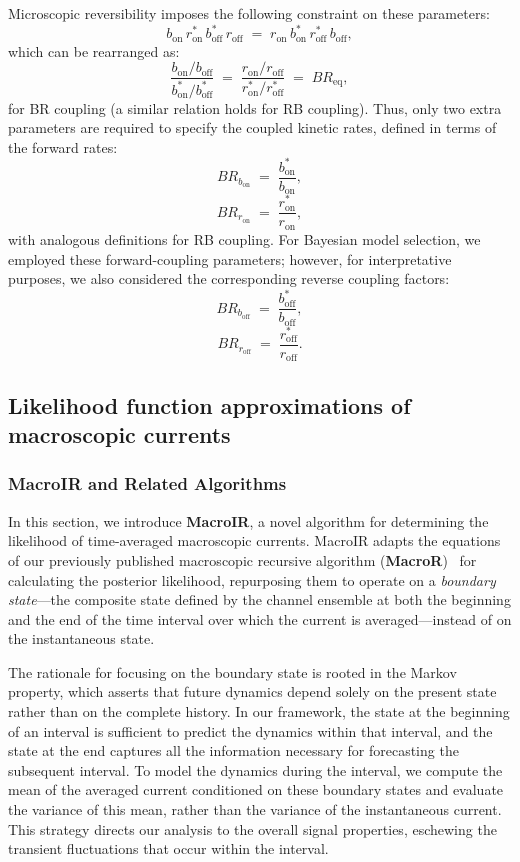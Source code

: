 \documentclass[9pt]{elife}
\begin{document}
	Microscopic reversibility imposes the following constraint on these parameters:
	\[
	b_{\text{on}} \, r^*_{\text{on}} \, b^*_{\text{off}} \, r_{\text{off}} \;=\; r_{\text{on}} \, b^*_{\text{on}} \, r^*_{\text{off}} \, b_{\text{off}},
	\]
	which can be rearranged as:
	\[
	\frac{b_{\text{on}}/b_{\text{off}}}{b^*_{\text{on}}/b^*_{\text{off}}} \;=\; \frac{r_{\text{on}}/r_{\text{off}}}{r^*_{\text{on}}/r^*_{\text{off}}} \;=\; BR_{\text{eq}},
	\]
	for BR coupling (a similar relation holds for RB coupling). Thus, only two extra parameters are required to specify the coupled kinetic rates, defined in terms of the forward rates:
	\[
	BR_{b_{\text{on}}} \;=\; \frac{b^*_{\text{on}}}{b_{\text{on}}},
	\]
	\[
	BR_{r_{\text{on}}} \;=\; \frac{r^*_{\text{on}}}{r_{\text{on}}},
	\]
	with analogous definitions for RB coupling. For Bayesian model selection, we employed these forward-coupling parameters; however, for interpretative purposes, we also considered the corresponding reverse coupling factors:
	\[
	BR_{b_{\text{off}}} \;=\; \frac{b^*_{\text{off}}}{b_{\text{off}}},
	\]
	\[
	BR_{r_{\text{off}}} \;=\; \frac{r^*_{\text{off}}}{r_{\text{off}}}.
	\]
	\subsection{Likelihood function approximations of macroscopic currents}
	\subsubsection{MacroIR and Related Algorithms}
	In this section, we introduce \textbf{MacroIR}, a novel algorithm for determining the likelihood of time-averaged macroscopic currents. MacroIR adapts the equations of our previously published macroscopic recursive algorithm (\textbf{MacroR})~\cite{Moffatt} for calculating the posterior likelihood, repurposing them to operate on a \emph{boundary state}---the composite state defined by the channel ensemble at both the beginning and the end of the time interval over which the current is averaged---instead of on the instantaneous state.
	
	The rationale for focusing on the boundary state is rooted in the Markov property, which asserts that future dynamics depend solely on the present state rather than on the complete history. In our framework, the state at the beginning of an interval is sufficient to predict the dynamics within that interval, and the state at the end captures all the information necessary for forecasting the subsequent interval. To model the dynamics during the interval, we compute the mean of the averaged current conditioned on these boundary states and evaluate the variance of this mean, rather than the variance of the instantaneous current. This strategy directs our analysis to the overall signal properties, eschewing the transient fluctuations that occur within the interval.
	
\end{document}
